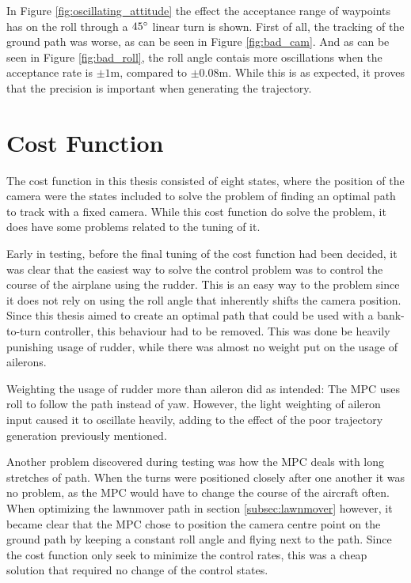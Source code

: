 In Figure \ref{fig:oscillating_attitude} the effect the acceptance range of waypoints has on the roll through a $45\degree$ linear turn is shown. First of all, the tracking of the ground path was worse, as can be seen in Figure \ref{fig:bad_cam}. And as can be seen in Figure \ref{fig:bad_roll}, the roll angle contais more oscillations when the acceptance rate is $\pm 1$m, compared to $\pm 0.08$m. While this is as expected, it proves that the precision is important when generating the trajectory.

\section{Cost Function}

The cost function in this thesis consisted of eight states, where the position of the camera were the states included to solve the problem of finding an optimal path to track with a fixed camera. While this cost function do solve the problem, it does have some problems related to the tuning of it.

Early in testing, before the final tuning of the cost function had been decided, it was clear that the easiest way to solve the control problem was to control the course of the airplane using the rudder. This is an easy way to the problem since it does not rely on using the roll angle that inherently shifts the camera position. Since this thesis aimed to create an optimal path that could be used with a bank-to-turn controller, this behaviour had to be removed. This was done be heavily punishing usage of rudder, while there was almost no weight put on the usage of ailerons.

Weighting the usage of rudder more than aileron did as intended: The MPC uses roll to follow the path instead of yaw. However, the light weighting of aileron input caused it to oscillate heavily, adding to the effect of the poor trajectory generation previously mentioned.

Another problem discovered during testing was how the MPC deals with long stretches of path. When the turns were positioned closely after one another it was no problem, as the MPC would have to change the course of the aircraft often. When optimizing the lawnmover path in section \ref{subsec:lawnmover} however, it became clear that the MPC chose to position the camera centre point on the ground path by keeping a constant roll angle and flying next to the path. Since the cost function only seek to minimize the control rates, this was a cheap solution that required no change of the control states.

